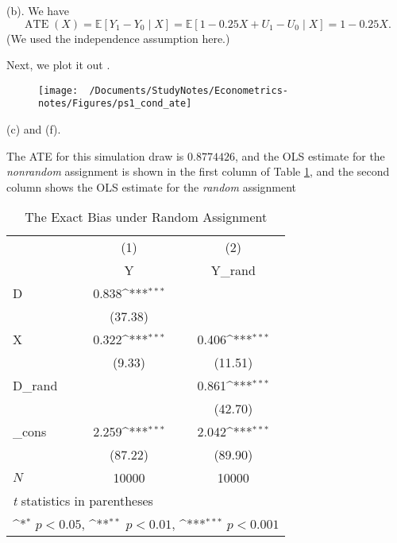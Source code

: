 \documentclass[11pt,a4paper]{amsart}
\theoremstyle{plain}
\theoremstyle{definition}
\begin{document}
(b). We have
\[	\operatorname{ATE}(X) = \mathbb{E}[Y_{1} - Y_{0} \mid X] =  \mathbb{E}[1 - 0.25X + U_{1} - U_{0} \mid X] = 1 - 0.25X.	\]
(We used the independence assumption here.)\par 
Next, we plot it out .

\begin{figure}[hbt]
	{\centering \texttt{[image: ~/Documents/StudyNotes/Econometrics-notes/Figures/ps1\_cond\_ate]}}
	\label{F:cond_ate}
\end{figure}

(c) and (f). \par 
The ATE for this simulation draw is $0.8774426$, and the OLS estimate for the \emph{nonrandom} assignment is shown in the first column of Table \ref{tb: p2_ols_nonrand_rand}, and the second column shows the OLS estimate for the \emph{random} assignment 

\begin{table}[hbt]
	\caption{\label{tb: p2_ols_nonrand_rand} The Exact Bias under Random Assignment}
{
	\def\sym#1{\ifmmode^{#1}\else\(^{#1}\)\fi}
	\begin{tabular}{l*{2}{c}}
		\hline\hline
		&\multicolumn{1}{c}{(1)}&\multicolumn{1}{c}{(2)}\\
		&\multicolumn{1}{c}{Y}&\multicolumn{1}{c}{Y\_rand}\\
		\hline
		D           &       0.838\sym{***}&                     \\
		&     (37.38)         &                     \\
		[1em]
		X           &       0.322\sym{***}&       0.406\sym{***}\\
		&      (9.33)         &     (11.51)         \\
		[1em]
		D\_rand      &                     &       0.861\sym{***}\\
		&                     &     (42.70)         \\
		[1em]
		\_cons      &       2.259\sym{***}&       2.042\sym{***}\\
		&     (87.22)         &     (89.90)         \\
		\hline
		\(N\)       &       10000         &       10000         \\
		\hline\hline
		\multicolumn{3}{l}{\footnotesize \textit{t} statistics in parentheses}\\
		\multicolumn{3}{l}{\footnotesize \sym{*} \(p<0.05\), \sym{**} \(p<0.01\), \sym{***} \(p<0.001\)}\\
	\end{tabular}
}
\end{table}
\newpage
\end{document}
